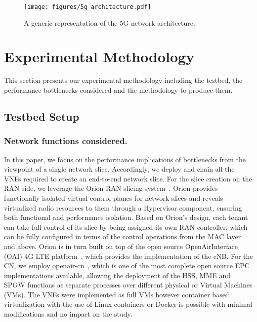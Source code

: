 \documentclass[journal,comsoc]{IEEEtran}
\begin{document}
\begin{figure}[t]
	\centering	
	\texttt{[image: figures/5g\_architecture.pdf]}
	\caption{A generic representation of the 5G network architecture.}
    \label{fig:5g_architecture}
    \vspace{-4mm}
\end{figure}

\section{Experimental Methodology}
\label{sec:methodology}

% 
This section presents our experimental methodology including the testbed, the performance bottlenecks considered and the methodology to produce them. 

% 
\subsection{Testbed Setup}
\label{sec:methodology_testbed}
% 
\subsubsection{Network functions considered.} 
In this paper, we focus on the performance implications of bottlenecks from the viewpoint of a single network slice. Accordingly, we deploy and chain all the VNFs required to create an end-to-end network slice. For the slice creation on the RAN side, we leverage the Orion RAN slicing system~\cite{foukas2017orion}.   
Orion provides functionally isolated virtual control planes for network slices and reveals virtualized radio resources to them through a Hypervisor component, ensuring both functional and performance isolation.
Based on Orion's design, each tenant can take full control of its slice by being assigned its own RAN controller, which can be fully configured in terms of the control operations from the MAC layer and above. 
Orion is in turn built on top of the open source OpenAirInterface (OAI) 4G LTE platform~\cite{nikaein2014openairinterface}, which provides the implementation of the eNB. 
For the CN, we employ openair-cn~\cite{openair_cn}, which is one of the most complete open source EPC implementations available, allowing the deployment of the HSS, MME and SPGW functions as separate processes over different physical or Virtual Machines (VMs).
The VNFs were implemented as full VMs however container based virtualization with the use of Linux containers or Docker is possible with minimal modifications and no impact on the study.
\end{document}
